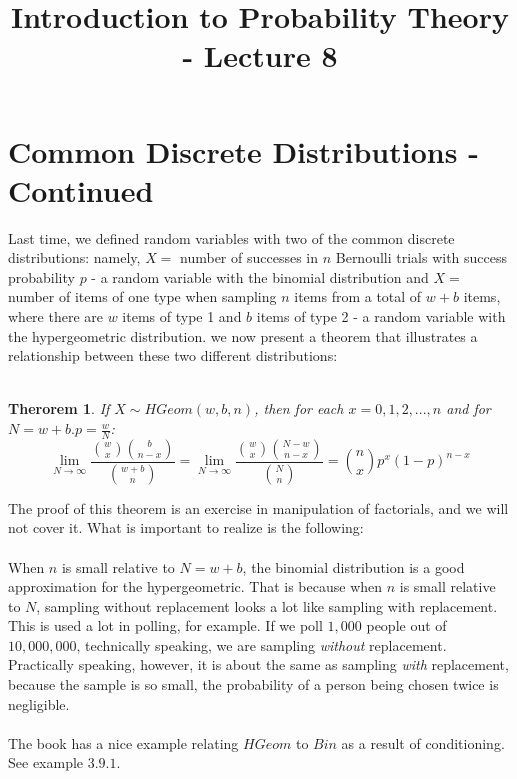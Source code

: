 \documentclass[12pt]{article} %
\date{}
\title{Introduction to Probability Theory - Lecture 8}
\newtheorem{thm}{Therorem}
\begin{document}
\maketitle
\section{Common Discrete Distributions - Continued}
Last time, we defined random variables with two of the common discrete distributions: namely, $X =$ number of successes in $n$ Bernoulli trials with success probability $p$ - a random variable with the binomial distribution and $X = $ number of items of one type when sampling $n$ items from a total of $w+b$ items, where there are $w$ items of type 1 and $b$ items of type 2 - a random variable with the hypergeometric distribution. we now present a theorem that illustrates a relationship between these two different distributions:\\\\
\begin{thm}
If $X\sim HGeom(w,b,n)$, then for each $x=0,1,2,...,n$ and for $N=w+b. p=\frac{w}N$:
$$\lim\limits_{N\rightarrow\infty}\frac{{w\choose{x}}{{b\choose{n-x}}}}{{{w+b}\choose{n}}} = \lim\limits_{N\rightarrow\infty}\frac{{w\choose{x}}{{{N-w}\choose{n-x}}}}{{{N}\choose{n}}} = {n\choose{x}}p^x\left(1-p\right)^{n-x}$$
\end{thm}
The proof of this theorem is an exercise in manipulation of factorials, and we will not cover it. What is important to realize is the following:\\\\
When $n$ is small relative to $N=w+b$, the binomial distribution is a good approximation for the hypergeometric. That is because when $n$ is small relative to $N$, sampling without replacement looks a lot like sampling with replacement.  This is used a lot in polling, for example. If we poll $1,000$ people out of $10,000,000$, technically speaking, we are sampling \emph{without} replacement. Practically speaking, however, it is about the same as sampling \emph{with} replacement, because the sample is so small, the probability of a person being chosen twice is negligible.\\\\
The book has a nice example relating $HGeom$ to $Bin$ as a result of conditioning. See example $3.9.1$.
\end{document}
